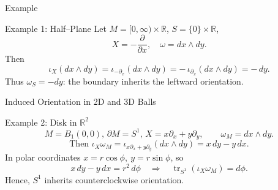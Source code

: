 \begin{frame}{Example}
\vspace{-0.2cm}
    \begin{block}{Example 1: Half–Plane}
Let \(M=[0,\infty)\times\mathbb{R}\), \(S=\{0\}\times\mathbb{R}\),
\vspace{-0.2cm}
\[
X=-\frac{\partial}{\partial x},\quad \omega=dx\wedge dy.
\]
Then
\vspace{-0.2cm}
\[
\iota_X(dx\wedge dy)
=\iota_{-\partial_x}(dx\wedge dy)
=-\,\iota_{\partial_x}(dx\wedge dy)
=-\,dy.
\]
Thus \(\omega_S=-dy\): the boundary inherits the leftward orientation.
\end{block}

\begin{center}
\end{center}
\end{frame}

\begin{frame}{Induced Orientation in 2D and 3D Balls}
\vspace{-0.2cm}
\begin{block}{Example 2: Disk in \(\mathbb{R}^2\)}
\vspace{-0.7cm}
\[
\text{\(M=B_1(0,0)\), \(\partial M=S^1\),\ \ }X=x\partial_x+y\partial_y,\qquad \omega_M=dx\wedge dy.
\]
\vspace{-0.4cm}
\[
\text{Then\ \ }\iota_X\omega_M = \iota_{x\partial_x+y\partial_y}(dx\wedge dy)
= x\,dy - y\,dx.
\]
In polar coordinates \(x=r\cos\phi,\ y=r\sin\phi\), so
\vspace{-0.2cm}
\[
x\,dy - y\,dx = r^2\,d\phi \quad \Rightarrow \quad
\operatorname{tr}_{S^1}(\iota_X\omega_M)=d\phi.
\]
Hence, \(S^1\) inherits counterclockwise orientation.
\end{block}
\vspace{-0.2cm}
\begin{center}
\end{center}
\end{frame}


